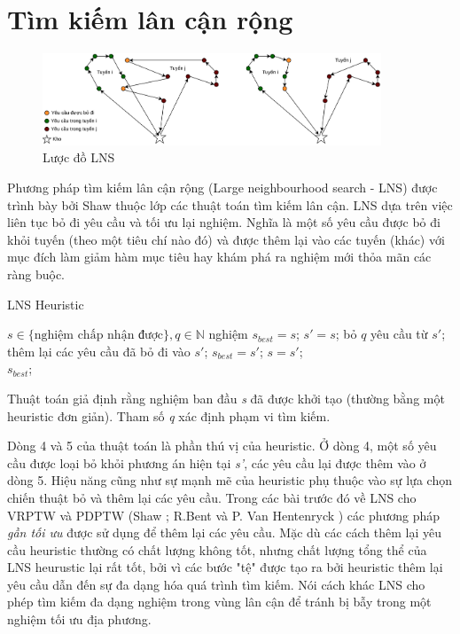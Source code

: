 \section{Tìm kiếm lân cận rộng}

\begin{figure}[H] %
  \centering %
  \includegraphics[width=0.9\textwidth]{figures/ALNS-paradim.png} 
  \caption{Lược đồ LNS} 
  \label{fig:lns_paradim}
\end{figure}

Phương pháp tìm kiếm lân cận rộng (Large neighbourhood search - LNS) được trình bày bởi Shaw \cite{shaw1998using} thuộc lớp các thuật toán tìm kiếm lân cận. LNS dựa trên việc liên tục bỏ đi yêu cầu và tối ưu lại nghiệm. Nghĩa là một số yêu cầu được bỏ đi khỏi tuyến (theo một tiêu chí nào đó) và được thêm lại vào các tuyến (khác) với mục đích làm giảm hàm mục tiêu hay khám phá ra nghiệm mới thỏa mãn các ràng buộc.

\begin{algorithm}
  \label{alg:lns}
	\caption{LNS Heuristic} 
	\begin{algorithmic}[1]
        \Require $s \in \text{\{nghiệm chấp nhận được\}}, q \in \mathbb{N}$
        \State nghiệm $s_{best} = s$;
				\Repeat
					\State $s'=s$;
					\State bỏ $q$ yêu cầu từ $s'$;
					\State thêm lại các yêu cầu đã bỏ đi vào $s'$;
						\State $s_{best} = s'$;
					\EndIf
						\State $s=s'$;
					\EndIf
				\\
				\Return $s_{best}$;
	\end{algorithmic} 
\end{algorithm}

Thuật toán giả định rằng nghiệm ban đầu \textit{s} đã được khởi tạo (thường bằng một heuristic đơn giản). Tham số \textit{q} xác định phạm vi tìm kiếm. 

Dòng 4 và 5 của thuật toán là phần thú vị của heuristic. Ở dòng 4, một số yêu cầu được loại bỏ khỏi phương án hiện tại \textit{s'}, các yêu cầu lại được thêm vào ở dòng 5. Hiệu năng cũng như sự mạnh mẽ của heuristic phụ thuộc vào sự lựa chọn chiến thuật bỏ và thêm lại các yêu cầu. Trong các bài trước đó về LNS cho VRPTW và PDPTW (Shaw \cite{shaw1997new}; R.Bent và P. Van Hentenryck \cite{bent2003two}) các phương pháp \textit{gần tối ưu} được sử dụng để thêm lại các yêu cầu. Mặc dù các cách thêm lại yêu cầu heuristic thường có chất lượng không tốt, nhưng chất lượng tổng thể của LNS heurustic lại rất tốt, bởi vì các bước "tệ" được tạo ra bởi heuristic thêm lại yêu cầu dẫn đến sự đa dạng hóa quá trình tìm kiếm. Nói cách khác LNS cho phép tìm kiếm đa dạng nghiệm trong vùng lân cận để tránh bị bẫy trong một nghiệm tối ưu địa phương.

